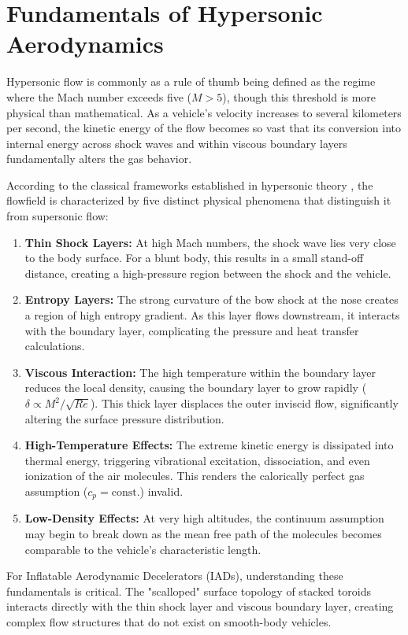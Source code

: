 \section{Fundamentals of Hypersonic Aerodynamics}

\par
Hypersonic flow is commonly as a rule of thumb being defined as the regime where the Mach number exceeds five ($M > 5$), though this threshold is more physical than mathematical. As a vehicle's velocity increases to several kilometers per second, the kinetic energy of the flow becomes so vast that its conversion into internal energy across shock waves and within viscous boundary layers fundamentally alters the gas behavior. 
\par
According to the classical frameworks established in hypersonic theory \cite{AndersonHypersonic}, the flowfield is characterized by five distinct physical phenomena that distinguish it from supersonic flow:
\par
\begin{enumerate}
    \item \textbf{Thin Shock Layers:} At high Mach numbers, the shock wave lies very close to the body surface. For a blunt body, this results in a small stand-off distance, creating a high-pressure region between the shock and the vehicle.
    \item \textbf{Entropy Layers:} The strong curvature of the bow shock at the nose creates a region of high entropy gradient. As this layer flows downstream, it interacts with the boundary layer, complicating the pressure and heat transfer calculations.
    \item \textbf{Viscous Interaction:} The high temperature within the boundary layer reduces the local density, causing the boundary layer to grow rapidly ($\delta \propto M^2/\sqrt{Re}$). This thick layer displaces the outer inviscid flow, significantly altering the surface pressure distribution.
    \item \textbf{High-Temperature Effects:} The extreme kinetic energy is dissipated into thermal energy, triggering vibrational excitation, dissociation, and even ionization of the air molecules. This renders the calorically perfect gas assumption ($c_p = \text{const.}$) invalid.
    \item \textbf{Low-Density Effects:} At very high altitudes, the continuum assumption may begin to break down as the mean free path of the molecules becomes comparable to the vehicle's characteristic length.
\end{enumerate}
\par
For Inflatable Aerodynamic Decelerators (IADs), understanding these fundamentals is critical. The "scalloped" surface topology of stacked toroids interacts directly with the thin shock layer and viscous boundary layer, creating complex flow structures that do not exist on smooth-body vehicles.
\par


